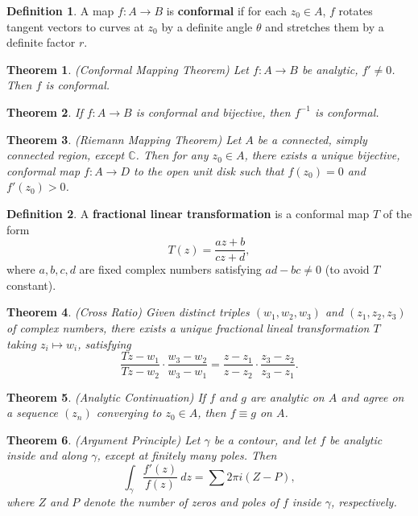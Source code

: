 \documentclass[11pt]{amsart}
\newtheorem*{theorem*}{Theorem}
\theoremstyle{definition}
\newtheorem*{definition*}{Definition}
\renewcommand\:{\colon}
\newcommand{\C}{\mathds{C}}
\begin{document}
\begin{definition*}
	A map $f\: A \to B$ is \textbf{conformal} if for each $z_0 \in A$, $f$ rotates tangent vectors to curves at $z_0$ by a definite angle $\theta$ and stretches them by a definite factor $r$.
\end{definition*}

\begin{theorem*}
	\textnormal{(Conformal Mapping Theorem)} Let $f\: A \to B$ be analytic, $f' \neq 0$. Then $f$ is conformal.
\end{theorem*}

\begin{theorem*}
	If $f\: A \to B$ is conformal and bijective, then $f^{-1}$ is conformal.
\end{theorem*}

\begin{theorem*}
	\textnormal{(Riemann Mapping Theorem)} Let $A$ be a connected, simply connected region, except $\C$. Then for any $z_0 \in A$, there exists a unique bijective, conformal map $f\: A \to D$ to the open unit disk such that $f(z_0) = 0$ and $f'(z_0) > 0$.
\end{theorem*}

\begin{definition*}
	A \textbf{fractional linear transformation} is a conformal map $T$ of the form 
		\[ T(z) = \frac{az + b}{cz + d}, \]
	where $a, b, c, d$ are fixed complex numbers satisfying $ad - bc \neq 0$ (to avoid $T$ constant).
\end{definition*}

\begin{theorem*}
	\textnormal{(Cross Ratio)} Given distinct triples $(w_1, w_2, w_3)$ and $(z_1, z_2, z_3)$ of complex numbers, there exists a unique fractional lineal transformation $T$ taking $z_i \mapsto w_i$, satisfying
		\[ \frac{Tz - w_1}{Tz - w_2} \cdot \frac{w_3 - w_2}{w_3 - w_1} = \frac{z - z_1}{z - z_2} \cdot \frac{z_3 - z_2}{z_3 - z_1}. \]
\end{theorem*}

\clearpage

\begin{theorem*}
	\textnormal{(Analytic Continuation)} If $f$ and $g$ are analytic on $A$ and agree on a sequence $(z_n)$ converging to $z_0 \in A$, then $f \equiv g$ on $A$.
\end{theorem*}

\begin{theorem*}
	\textnormal{(Argument Principle)} Let $\gamma$ be a contour, and let $f$ be analytic inside and along $\gamma$, except at finitely many poles. Then 
		\[ \int_\gamma \frac{f'(z)}{f(z)} \ dz = \sum 2\pi i(Z - P), \]
	where $Z$ and $P$ denote the number of zeros and poles of $f$ inside $\gamma$, respectively.
\end{theorem*}
\end{document}
